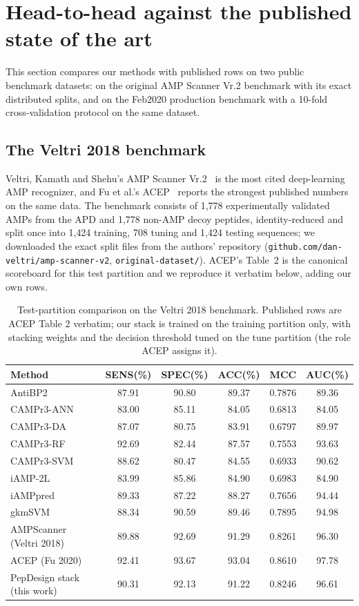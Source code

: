 \section{Head-to-head against the published state of the art}
\label{sec:sota}

This section compares our methods with published rows on two public
benchmark datasets: on the
original AMP Scanner Vr.2 benchmark with its exact distributed splits, and
on the Feb2020 production benchmark with a 10-fold
cross-validation protocol on the same dataset.

\subsection{The Veltri 2018 benchmark}
Veltri, Kamath and Shehu's AMP Scanner Vr.2~\cite{ampscanner} is the most
cited deep-learning AMP recognizer, and Fu et al.'s ACEP~\cite{acep} reports
the strongest published numbers on the same data. The benchmark consists of
1{,}778 experimentally validated AMPs from the APD and 1{,}778 non-AMP
decoy peptides, identity-reduced and split once into 1{,}424 training, 708
tuning and 1{,}424 testing sequences; we downloaded the exact split files
from the authors' repository
(\texttt{github.com/dan-veltri/amp-scanner-v2}, \texttt{original-dataset/}).
ACEP's Table~2 is the canonical scoreboard for this test partition and we
reproduce it verbatim below, adding our own rows.

\begin{table}[h]\centering\small
\caption{Test-partition comparison on the Veltri 2018 benchmark. Published
rows are ACEP Table 2 verbatim; our stack is trained on the training
partition only, with stacking weights and the decision threshold tuned on
the tune partition (the role ACEP assigns it).}
\label{tab:sota}
\begin{tabular}{lccccc}
\hline
Method & SENS(\%) & SPEC(\%) & ACC(\%) & MCC & AUC(\%) \\
\hline
AntiBP2 & 87.91 & 90.80 & 89.37 & 0.7876 & 89.36 \\
CAMPr3-ANN & 83.00 & 85.11 & 84.05 & 0.6813 & 84.05 \\
CAMPr3-DA & 87.07 & 80.75 & 83.91 & 0.6797 & 89.97 \\
CAMPr3-RF & 92.69 & 82.44 & 87.57 & 0.7553 & 93.63 \\
CAMPr3-SVM & 88.62 & 80.47 & 84.55 & 0.6933 & 90.62 \\
iAMP-2L & 83.99 & 85.86 & 84.90 & 0.6983 & 84.90 \\
iAMPpred & 89.33 & 87.22 & 88.27 & 0.7656 & 94.44 \\
gkmSVM & 88.34 & 90.59 & 89.46 & 0.7895 & 94.98 \\
AMPScanner (Veltri 2018) & 89.88 & 92.69 & 91.29 & 0.8261 & 96.30 \\
ACEP (Fu 2020) & 92.41 & 93.67 & 93.04 & 0.8610 & 97.78 \\
PepDesign stack (this work) & 90.31 & 92.13 & 91.22 & 0.8246 & 96.61 \\
\hline
\end{tabular}
\end{table}

